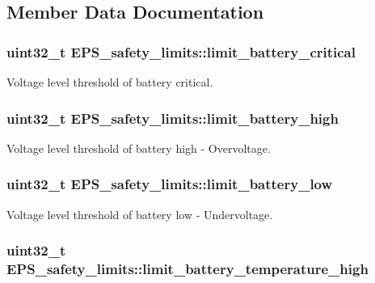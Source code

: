 \subsection{Member Data Documentation}
\hypertarget{struct_e_p_s__safety__limits_a2e17c5ab10147b9d067fd1e5cb187edd}{
\subsubsection[{limit\-\_\-battery\-\_\-critical}]{\setlength{\rightskip}{0pt plus 5cm}uint32\-\_\-t E\-P\-S\-\_\-safety\-\_\-limits\-::limit\-\_\-battery\-\_\-critical}}\label{struct_e_p_s__safety__limits_a2e17c5ab10147b9d067fd1e5cb187edd}
Voltage level threshold of battery critical. \hypertarget{struct_e_p_s__safety__limits_a158a30d24036f68a9ecadce30c75e619}{
\subsubsection[{limit\-\_\-battery\-\_\-high}]{\setlength{\rightskip}{0pt plus 5cm}uint32\-\_\-t E\-P\-S\-\_\-safety\-\_\-limits\-::limit\-\_\-battery\-\_\-high}}\label{struct_e_p_s__safety__limits_a158a30d24036f68a9ecadce30c75e619}
Voltage level threshold of battery high -\/ Overvoltage. \hypertarget{struct_e_p_s__safety__limits_aa7d1e0bc82ec3f5fb8f879ba1b8ebcef}{
\subsubsection[{limit\-\_\-battery\-\_\-low}]{\setlength{\rightskip}{0pt plus 5cm}uint32\-\_\-t E\-P\-S\-\_\-safety\-\_\-limits\-::limit\-\_\-battery\-\_\-low}}\label{struct_e_p_s__safety__limits_aa7d1e0bc82ec3f5fb8f879ba1b8ebcef}
Voltage level threshold of battery low -\/ Undervoltage. \hypertarget{struct_e_p_s__safety__limits_a39027034504fbe06a380c1bf045c5fd0}{
\subsubsection[{limit\-\_\-battery\-\_\-temperature\-\_\-high}]{\setlength{\rightskip}{0pt plus 5cm}uint32\-\_\-t E\-P\-S\-\_\-safety\-\_\-limits\-::limit\-\_\-battery\-\_\-temperature\-\_\-high}}\label{struct_e_p_s__safety__limits_a39027034504fbe06a380c1bf045c5fd0}
